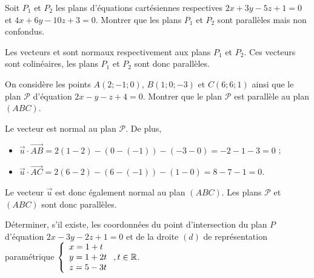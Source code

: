 \documentclass[11pt,fleqn, openany]{book} %
\begin{document}
\begin{exercise}Soit $P_1$ et $P_2$ les plans d'équations cartésiennes respectives $2x+3y-5z+1=0$ et $4x+6y-10z+3=0$. Montrer que les plans $P_1$ et $P_2$ sont parallèles mais non confondus.\end{exercise}

\begin{solution}Les vecteurs  et  sont normaux respectivement aux plans $P_1$ et $P_2$. Ces vecteurs sont colinéaires, les plans $P_1$ et $P_2$ sont donc parallèles.\end{solution}



\begin{exercise}On considère les points $A(2;-1;0)$, $B(1;0;-3)$ et $C(6;6;1)$ ainsi que le plan $\mathcal{P}$ d'équation  $2x-y-z+4=0$. Montrer que le plan $\mathcal{P}$ est parallèle au plan $(ABC)$.\end{exercise}

\begin{solution}Le vecteur  est normal au plan $\mathcal{P}$. De plus,
\begin{itemize}
\item $\vec u \cdot \overrightarrow{AB} = 2(1-2)-(0-(-1))-(-3-0)=-2-1-3=0$ ;
\item $\vec u \cdot \overrightarrow{AC} = 2(6-2)-(6-(-1))-(1-0)=8-7-1=0$.
\end{itemize}
Le vecteur $\vec u$ est donc également normal au plan $(ABC)$. Les plans $\mathcal{P}$ et $(ABC)$ sont donc parallèles.\end{solution}





\begin{exercise}Déterminer, s'il existe, les coordonnées du point d'intersection du plan $P$ d'équation  $ 2x-3y-2z+1=0$ et de la droite $(d)$ de représentation paramétrique $\left\{ \renewcommand{\arraystretch}{1}\renewcommand{\arraystretch}{1}\begin{array}{l}x=1+t \\ y=1+2t \\ z = 5-3t \\\end{array}\right., t \in \mathbb{R}$.\end{exercise}
\end{document}
